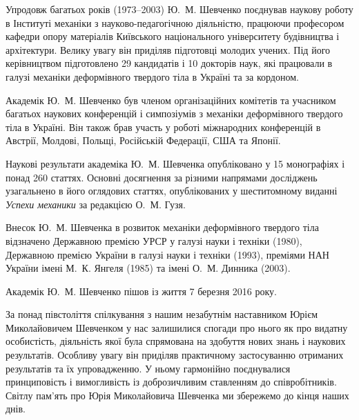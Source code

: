 Упродовж багатьох років (1973--2003) Ю.~М. Шевченко поєднував наукову роботу в Інституті механіки з науково-педагогічною діяльністю, працюючи професором кафедри опору матеріалів Київського національного університету будівництва і архітектури. Велику увагу він приділяв підготовці молодих учених. Під його керівництвом підготовлено 29 кандидатів і 10 докторів наук, які працювали в галузі механіки деформівного твердого тіла в Україні та за кордоном.

Академік Ю.~М. Шевченко був членом організаційних комітетів та учасником багатьох наукових конференцій і симпозіумів з механіки деформівного твердого тіла в Україні. Він також брав участь у роботі міжнародних конференцій в Австрії, Молдові, Польщі, Російській Федерації, США та Японії.

Наукові результати академіка Ю.~М. Шевченка опубліковано у 15 монографіях і понад 260 статтях. Основні досягнення за різними напрямами досліджень узагальнено в його оглядових статтях, опублікованих у шеститомному виданні \emph{Успехи механики} за редакцією О.~М. Гузя.

Внесок Ю.~М. Шевченка в розвиток механіки деформівного твердого тіла відзначено Державною премією УРСР у галузі науки і техніки (1980), Державною премією України в галузі науки і техніки (1993), преміями НАН України імені М.~К. Янгеля (1985) та імені О.~М. Динника (2003).

Академік Ю.~М. Шевченко пішов із життя 7 березня 2016 року.

За понад півстоліття спілкування з нашим незабутнім наставником Юрієм Миколайовичем Шевченком у нас залишилися спогади про нього як про видатну особистість, діяльність якої була спрямована на здобуття нових знань і наукових результатів. Особливу увагу він приділяв практичному застосуванню отриманих результатів та їх упровадженню. У ньому гармонійно поєднувалися принциповість і вимогливість із доброзичливим ставленням до співробітників. Світлу пам'ять про Юрія Миколайовича Шевченка ми збережемо до кінця наших днів.

